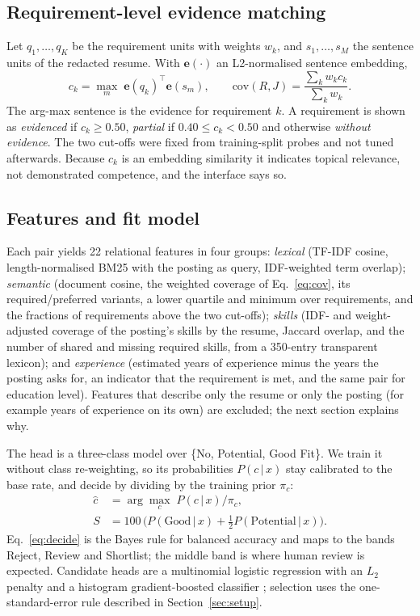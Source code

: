 \subsection{Requirement-level evidence matching}
Let $q_1,\dots,q_K$ be the requirement units with weights $w_k$, and $s_1,\dots,s_M$ the
sentence units of the redacted resume. With $\mathbf{e}(\cdot)$ an L2-normalised sentence embedding,
\begin{equation}
c_k=\max_{m}\;\mathbf{e}(q_k)^{\!\top}\mathbf{e}(s_m),\qquad
\mathrm{cov}(R,J)=\frac{\sum_k w_k c_k}{\sum_k w_k}.
\label{eq:cov}
\end{equation}
The arg-max sentence is the evidence for requirement $k$. A requirement is shown as \emph{evidenced}
if $c_k\ge0.50$, \emph{partial} if $0.40\le c_k<0.50$ and otherwise \emph{without evidence}. The two
cut-offs were fixed from training-split probes and not tuned afterwards. Because $c_k$ is an embedding
similarity it indicates topical relevance, not demonstrated competence, and the interface says so.

\subsection{Features and fit model}
Each pair yields 22 relational features in four groups: \emph{lexical} (TF-IDF cosine, length-normalised
BM25 with the posting as query, IDF-weighted term overlap); \emph{semantic} (document cosine, the
weighted coverage of Eq.~\eqref{eq:cov}, its required/preferred variants, a lower quartile and minimum
over requirements, and the fractions of requirements above the two cut-offs); \emph{skills}
(IDF- and weight-adjusted coverage of the posting's skills by the resume, Jaccard overlap, and the
number of shared and missing required skills, from a 350-entry transparent lexicon); and
\emph{experience} (estimated years of experience minus the years the posting asks for, an indicator
that the requirement is met, and the same pair for education level). Features that describe only the
resume or only the posting (for example years of experience on its own) are excluded; the next
section explains why.

The head is a three-class model over \{No, Potential, Good Fit\}. We train it without class
re-weighting, so its probabilities $P(c\,|\,x)$ stay calibrated to the base rate, and decide by
dividing by the training prior $\pi_c$:
\begin{align}
\hat c &= \arg\max_c \; P(c\,|\,x)/\pi_c, \label{eq:decide}\\
S &= 100\,\big(P(\text{Good}\,|\,x)+\tfrac12 P(\text{Potential}\,|\,x)\big). \label{eq:score}
\end{align}
Eq.~\eqref{eq:decide} is the Bayes rule for balanced accuracy and maps to the bands Reject, Review and
Shortlist; the middle band is where human review is expected. Candidate heads are a multinomial
logistic regression with an $L_2$ penalty and a histogram gradient-boosted classifier
\cite{pedregosa2011sklearn}; selection uses the one-standard-error rule described in
Section~\ref{sec:setup}.

